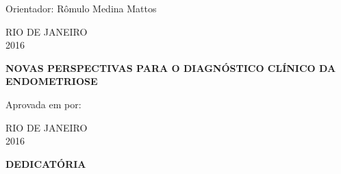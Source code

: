 \documentclass[12pt]{article} %
\begin{document}
\vspace{4.5cm}

\vspace{0.5cm}

\flushright\theauthor

\vspace{2.5cm}

\raggedright Orientador: Rômulo Medina Mattos

\vspace{2.0cm}
\begin{center}
\MakeUppercase{Rio de Janeiro}\\
2016
\end{center}

\newpage





\begin{center}
\MakeUppercase{\theauthor}
\end{center}

\vspace{2.0cm}

\begin{center}
\MakeUppercase{\textbf{Novas perspectivas para o diagnóstico clínico da endometriose}}
\end{center}

\vspace{2.0cm}

Aprovada em  por:

\vspace{9.0cm}

\begin{center}
\MakeUppercase{Rio de Janeiro}\\
2016
\end{center}

\newpage

\begin{center}

\MakeUppercase{\textbf{Dedicatória}}
\end{center}


\newpage
\end{document}
